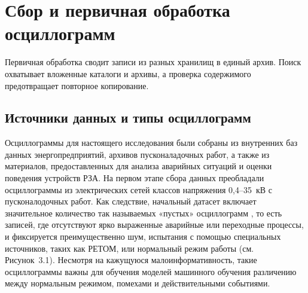 
\section{Сбор и первичная обработка осциллограмм}\label{sec:ch3_data_collection}

Первичная обработка сводит записи из разных хранилищ в единый архив. Поиск охватывает
вложенные каталоги и архивы, а проверка содержимого предотвращает повторное копирование.

\subsection{Источники данных и типы осциллограмм}\label{sec:ch3_data_sources}

Осциллограммы для настоящего исследования были собраны из внутренних баз данных
энергопредприятий, архивов пусконаладочных работ, а также из материалов, предоставленных
для анализа аварийных ситуаций и оценки поведения устройств РЗА. На первом этапе сбора
данных преобладали осциллограммы из электрических сетей классов напряжения 0,4--35~кВ с
пусконалодочных работ. Как следствие, начальный датасет включает значительное количество
так называемых «пустых» осциллограмм \cite{bavr_bib_095_a_2024,bavr_bib_096_g_2024}, то
есть записей, где отсутствуют ярко выраженные аварийные или переходные процессы, и
фиксируется преимущественно шум, испытания с помощью специальных источников, таких как
РЕТОМ, или нормальный режим работы (см. Рисунок~3.1). Несмотря на кажущуюся
малоинформативность, такие осциллограммы важны для обучения моделей машинного обучения
различению между нормальным режимом, помехами и действительными
событиями.\par\vspace{0.2cm}

